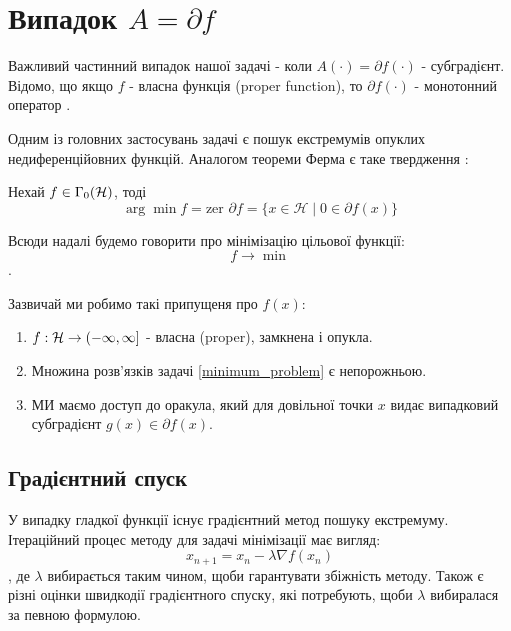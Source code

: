 \documentclass[main.tex]{subfile}
\begin{document}
	\section{Випадок $A= \partial f$}
	Важливий частинний випадок нашої задачі - коли $A(\cdot) = \partial f(\cdot)$ - субградієнт. Відомо, що якщо $f$ - власна функція (proper function), то $\partial f(\cdot)$ - монотонний оператор \cite{bauschke}.  
	
	Одним із головних застосувань задачі є пошук екстремумів опуклих недиференційовних функцій. Аналогом теореми Ферма є таке твердження \cite{bauschke}:
	\begin{theorem}
		Нехай $f \in \Gamma_0(\mathcal{H})$, тоді
		\[\arg \min f = \text{zer }  \partial f = \{x \in \mathcal{H} \mid 0 \in \partial f(x) \}\]
	\end{theorem}

    Всюди надалі будемо говорити про мінімізацію цільової функції:
     \begin{equation}
     	f \rightarrow \min
     	\label{minimum_problem}
     \end{equation}.
    
    Зазвичай ми робимо такі припущеня про $f(x)$:
    \begin{enumerate}
    	\item $f : \mathcal{H} \rightarrow (-\infty, \infty]$ - власна (proper), замкнена і опукла.
    	\item Множина розв'язків задачі \ref{minimum_problem} є непорожньою.
    	\item МИ маємо доступ до оракула, який для довільної точки $x$ видає 
    	випадковий субградієнт $g(x) \in \partial f(x)$. 
    \end{enumerate}

    \subsection{Градієнтний спуск}
    У випадку гладкої функції існує градієнтний метод пошуку екстремуму. Ітераційний процес методу для задачі мінімізації має вигляд:
    \[ x_{n+1} = x_n -\lambda \nabla f(x_n) \]
    , де  $ \lambda $ вибирається таким чином, щоби гарантувати збіжність методу. Також є різні оцінки швидкодії градієнтного спуску, які потребують, щоби $\lambda$ вибиралася за певною формулою. 
    
\end{document}
